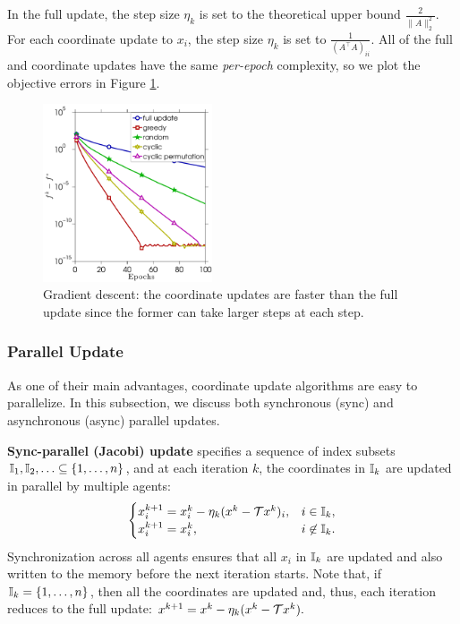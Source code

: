 In the full update, the step size $\eta_k$ is set to the theoretical upper bound $\frac{2}{\|A\|_2^2}$. For each coordinate update to $x_i$, the step size $\eta_k$ is set to $\frac{1}{(A^{\top}A)_{ii}}$. All of the full and coordinate updates have the same \emph{per-epoch} complexity, so we plot the objective errors in Figure \ref{fig:ls_full_vs_coord}. 
\begin{figure}[!htbp] \centering
\includegraphics[width=50mm]{./figs/randn_matrix_cropped}

\caption{Gradient descent: the coordinate updates are faster than the full update since the former can take larger steps at each step.}
\label{fig:ls_full_vs_coord}
\end{figure}



\subsubsection{Parallel Update} As one of their main advantages, coordinate update algorithms are easy to parallelize. In this subsection, we discuss  both synchronous (sync) and asynchronous (async) parallel updates.

\textbf{Sync-parallel (Jacobi) update} specifies a sequence of index subsets $\mathbb{I}_1,\mathbb{I}_2,\ldots \subseteq \{1,\ldots,n\}$, and at each iteration $k$,  the coordinates in $\mathbb{I}_k$ are updated in parallel by multiple agents:
$$ \begin{cases}
x^{k+1}_{i} = x_{i}^k - \eta_k(x^k-\cT x^k)_{i},& i\in \II_k,\\
x^{k+1}_{i} = x_i^k,&i\not\in \II_k.
\end{cases}
$$
Synchronization across all agents ensures that  all $x_i$ in $\mathbb{I}_k$ are updated and also written to the memory before the next iteration starts. Note that, if $\mathbb{I}_k=\{1,\ldots,n\}$, then all the coordinates are updated and, thus, each iteration reduces to the full update: $x^{k+1} =  x^k - \eta_k(x^k-{\mathcal{T}} x^k).$ 

